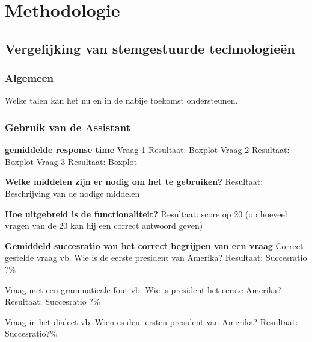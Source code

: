
\chapter{Methodologie}
\label{ch:methodologie}


\section{Vergelijking van stemgestuurde technologieën}
\label{sec:vergelijking van stemgestuurde technologieën}

\subsection{Algemeen}
\label{sec:algemeen}
Welke talen kan het nu en in de nabije toekomst ondersteunen.

\subsection{Gebruik van de Assistant}
\label{sec:gebruik van de assistant}
\textbf{gemiddelde response time}
Vraag 1
Resultaat: Boxplot
Vraag 2
Resultaat: Boxplot
Vraag 3
Resultaat: Boxplot

\textbf{Welke middelen zijn er nodig om het te gebruiken?}
Resultaat: Beschrijving van de nodige middelen

\textbf{Hoe uitgebreid is de functionaliteit?}
Resultaat: score op 20 (op hoeveel vragen van de 20 kan hij een correct antwoord geven)

\textbf{Gemiddeld succesratio van het correct begrijpen van een vraag}
Correct gestelde vraag
vb. Wie is de eerste president van Amerika?
Resultaat: Succesratio ?\%

Vraag met een grammaticale fout
vb. Wie is president het eerste Amerika?
Resultaat: Succesratio ?\%

Vraag in het dialect
vb. Wien es den iersten president van Amerika?
Resultaat: Succesratio?\%

